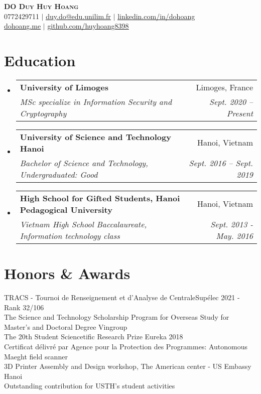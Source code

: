 \documentclass[letterpaper,11pt]{article}
\makeatletter
\newcommand{\resumeSubheading}[4]{
  \vspace{-2pt}\item
    \begin{tabular*}{0.97\textwidth}[t]{l@{\extracolsep{\fill}}r}
      \textbf{#1} & #2 \\
      \textit{\small#3} & \textit{\small #4} \\
    \end{tabular*}\vspace{-7pt}
}
\newcommand{\resumeSubHeadingListStart}{\begin{itemize}[leftmargin=0.15in, label={}]}
\newcommand{\resumeSubHeadingListEnd}{\end{itemize}}
\makeatother
\begin{document}

\begin{center}
    \textbf{\Huge \scshape DO Duy Huy Hoang} \\ \vspace{1pt}
    \small 0772429711 $|$ \href{mailto:duy.do@etu.unilim.fr}{\underline{duy.do@edu.unilim.fr}} $|$ 
    \href{https://linkedin.com/in/dohoang}{\underline{linkedin.com/in/dohoang}}\\
    \href{https://dohoang.me}{\underline{dohoang.me}} $|$
    \href{https://github.com/huyhoang8398}{\underline{github.com/huyhoang8398}}
\end{center}

\section{Education}
  \resumeSubHeadingListStart
    \resumeSubheading
      {University of Limoges}{Limoges, France}
      {MSc specialize in Information Security and Cryptography}{Sept. 2020 -- Present}
    \resumeSubheading
      {University of Science and Technology Hanoi}{Hanoi, Vietnam}
      {Bachelor of Science and Technology, Undergraduated: Good}{Sept. 2016 -- Sept. 2019}
    \resumeSubheading
      {High School for Gifted Students, Hanoi Pedagogical University}{Hanoi, Vietnam}
      {Vietnam High School Baccalaureate, Information technology class}{Sept. 2013 - May. 2016}
  \resumeSubHeadingListEnd

\section{Honors \& Awards}
 \begin{itemize}[leftmargin=0.15in, label={}]
    \small{\item{
      {TRACS - Tournoi de Renseignement et d’Analyse de CentraleSupélec 2021 - Rank 32/106} \\
      {The Science and Technology Scholarship Program for Overseas Study for Master's and Doctoral Degree Vingroup}\\
      {The 20th Student Sciencetific Research Prize Eureka 2018}\\
      {Certificat délivré par Agence pour la Protection des Programmes: Autonomous Maeght field scanner}\\
      {3D Printer Assembly and Design workshop, The American center - US Embassy Hanoi}\\
      {Outstanding contribution for USTH's student activities}
    }}
 \end{itemize}
\end{document}
